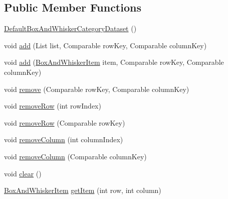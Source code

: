 \subsection*{Public Member Functions}
\begin{DoxyCompactItemize}
\item 
\mbox{\hyperlink{classorg_1_1jfree_1_1data_1_1statistics_1_1_default_box_and_whisker_category_dataset_ab8c5920cd1bdfec5dce2245659f52829}{Default\+Box\+And\+Whisker\+Category\+Dataset}} ()
\item 
void \mbox{\hyperlink{classorg_1_1jfree_1_1data_1_1statistics_1_1_default_box_and_whisker_category_dataset_a132859d6ebc31c9992ffcdfd59e4aab3}{add}} (List list, Comparable row\+Key, Comparable column\+Key)
\item 
void \mbox{\hyperlink{classorg_1_1jfree_1_1data_1_1statistics_1_1_default_box_and_whisker_category_dataset_a3c62aefa490590e84f3f03faa59639bc}{add}} (\mbox{\hyperlink{classorg_1_1jfree_1_1data_1_1statistics_1_1_box_and_whisker_item}{Box\+And\+Whisker\+Item}} item, Comparable row\+Key, Comparable column\+Key)
\item 
void \mbox{\hyperlink{classorg_1_1jfree_1_1data_1_1statistics_1_1_default_box_and_whisker_category_dataset_a822e79c57ac5bfc5061b0061636a40ae}{remove}} (Comparable row\+Key, Comparable column\+Key)
\item 
void \mbox{\hyperlink{classorg_1_1jfree_1_1data_1_1statistics_1_1_default_box_and_whisker_category_dataset_af24e62453a400ecb5461a61845ba83e3}{remove\+Row}} (int row\+Index)
\item 
void \mbox{\hyperlink{classorg_1_1jfree_1_1data_1_1statistics_1_1_default_box_and_whisker_category_dataset_a574143d92c8a301f0f1d8c13522a0295}{remove\+Row}} (Comparable row\+Key)
\item 
void \mbox{\hyperlink{classorg_1_1jfree_1_1data_1_1statistics_1_1_default_box_and_whisker_category_dataset_a56079e33cbaf78aa51c310f59c54ed74}{remove\+Column}} (int column\+Index)
\item 
void \mbox{\hyperlink{classorg_1_1jfree_1_1data_1_1statistics_1_1_default_box_and_whisker_category_dataset_a05f866339c950f6f63894e1c04f7badd}{remove\+Column}} (Comparable column\+Key)
\item 
void \mbox{\hyperlink{classorg_1_1jfree_1_1data_1_1statistics_1_1_default_box_and_whisker_category_dataset_a65fadfb3501a795de699cc5dca593954}{clear}} ()
\item 
\mbox{\hyperlink{classorg_1_1jfree_1_1data_1_1statistics_1_1_box_and_whisker_item}{Box\+And\+Whisker\+Item}} \mbox{\hyperlink{classorg_1_1jfree_1_1data_1_1statistics_1_1_default_box_and_whisker_category_dataset_a85c944b06e4337059ea728b3a744e2a9}{get\+Item}} (int row, int column)

\end{DoxyCompactItemize}
